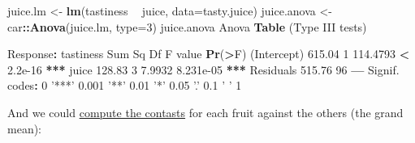 \documentclass[]{article}
\newenvironment{Shaded}{\begin{snugshade}}{\end{snugshade}}
\newcommand{\DataTypeTok}[1]{\textcolor[rgb]{0.13,0.29,0.53}{#1}}
\newcommand{\DecValTok}[1]{\textcolor[rgb]{0.00,0.00,0.81}{#1}}
\newcommand{\ErrorTok}[1]{\textcolor[rgb]{0.64,0.00,0.00}{\textbf{#1}}}
\newcommand{\FloatTok}[1]{\textcolor[rgb]{0.00,0.00,0.81}{#1}}
\newcommand{\KeywordTok}[1]{\textcolor[rgb]{0.13,0.29,0.53}{\textbf{#1}}}
\newcommand{\NormalTok}[1]{#1}
\newcommand{\OperatorTok}[1]{\textcolor[rgb]{0.81,0.36,0.00}{\textbf{#1}}}
\newcommand{\StringTok}[1]{\textcolor[rgb]{0.31,0.60,0.02}{#1}}
\begin{document}
\begin{Shaded}
\begin{Highlighting}[]
\NormalTok{juice.lm <-}\StringTok{ }\KeywordTok{lm}\NormalTok{(tastiness }\OperatorTok{~}\StringTok{ }\NormalTok{juice, }\DataTypeTok{data=}\NormalTok{tasty.juice)}
\NormalTok{juice.anova <-}\StringTok{ }\NormalTok{car}\OperatorTok{::}\KeywordTok{Anova}\NormalTok{(juice.lm, }\DataTypeTok{type=}\DecValTok{3}\NormalTok{)}
\NormalTok{juice.anova}
\NormalTok{Anova }\KeywordTok{Table}\NormalTok{ (Type III tests)}

\NormalTok{Response}\OperatorTok{:}\StringTok{ }\NormalTok{tastiness}
\NormalTok{            Sum Sq Df  F value    }\KeywordTok{Pr}\NormalTok{(}\OperatorTok{>}\NormalTok{F)    }
\NormalTok{(Intercept) }\FloatTok{615.04}  \DecValTok{1} \FloatTok{114.4793} \OperatorTok{<}\StringTok{ }\FloatTok{2.2e-16} \OperatorTok{**}\ErrorTok{*}
\NormalTok{juice       }\FloatTok{128.83}  \DecValTok{3}   \FloatTok{7.9932} \FloatTok{8.231e-05} \OperatorTok{**}\ErrorTok{*}
\NormalTok{Residuals   }\FloatTok{515.76} \DecValTok{96}                       
\OperatorTok{---}
\NormalTok{Signif. codes}\OperatorTok{:}\StringTok{  }\DecValTok{0} \StringTok{'***'} \FloatTok{0.001} \StringTok{'**'} \FloatTok{0.01} \StringTok{'*'} \FloatTok{0.05} \StringTok{'.'} \FloatTok{0.1} \StringTok{' '} \DecValTok{1}
\end{Highlighting}
\end{Shaded}

And we could \protect\hyperlink{contrasts}{compute the contasts} for each fruit against the
others (the grand mean):
\end{document}

